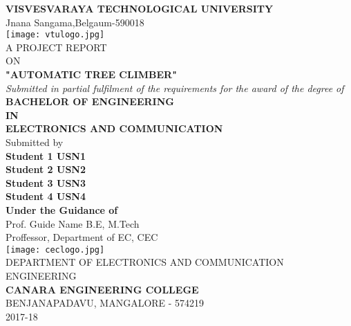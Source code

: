 \documentclass[12pt,a4paper]{article}
\begin{document}
\begin{center}
\textbf{\large{VISVESVARAYA TECHNOLOGICAL UNIVERSITY}}\\
Jnana Sangama,Belgaum-590018\\
\vspace{0.2in}
\texttt{[image: vtulogo.jpg]}\\
A PROJECT REPORT\\ON\\
\textbf{"AUTOMATIC TREE CLIMBER"}\\
\textit{Submitted in partial fulfilment of the requirements for the award of the degree of}\\
\vspace{0.1in}
\textbf{BACHELOR OF ENGINEERING}\\
\textbf{IN}\\
\textbf{ELECTRONICS AND COMMUNICATION}\\
Submitted by\\
\vspace{0.5cm}
\textbf{Student 1 \hspace{8cm} USN1\\
Student 2 \hspace{8cm} USN2\\
Student 3 \hspace{8cm} USN3\\
Student 4 \hspace{8cm} USN4\\}
\vspace{1cm}
\textbf{Under the Guidance of}\\
\vspace{0.2cm}
Prof. Guide Name {\tiny B.E, M.Tech}\\
Proffessor, Department of EC, CEC\\
\vspace{1cm}
\texttt{[image: ceclogo.jpg]}\\
\vspace{1cm}
DEPARTMENT OF ELECTRONICS AND COMMUNICATION ENGINEERING\\
\vspace{0.2cm}
\textbf{\large{CANARA ENGINEERING COLLEGE}}\\
\vspace{0.2cm}
BENJANAPADAVU, MANGALORE - 574219\\
2017-18\\
\end{center}
\end{document}
